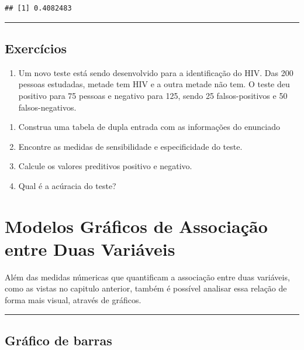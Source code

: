 \documentclass[
]{book}
\providecommand{\tightlist}{%
  \setlength{\itemsep}{0pt}\setlength{\parskip}{0pt}}
\begin{document}
\begin{verbatim}
## [1] 0.4082483
\end{verbatim}

\begin{center}\rule{0.5\linewidth}{0.5pt}\end{center}

\section{Exercícios}\label{exercuxedcios-4}

\begin{enumerate}
\def\labelenumi{\arabic{enumi}.}
\tightlist
\item
  Um novo teste está sendo desenvolvido para a identificação do HIV. Das 200 pessoas estudadas, metade tem HIV e a outra metade não tem. O teste deu positivo para 75 pessoas e negativo para 125, sendo 25 falsos-positivos e 50 falsos-negativos.
\end{enumerate}

\begin{enumerate}
\def\labelenumi{(\alph{enumi})}
\tightlist
\item
  Construa uma tabela de dupla entrada com as informações do enunciado
\item
  Encontre as medidas de sensibilidade e especificidade do teste.
\item
  Calcule os valores preditivos positivo e negativo.
\item
  Qual é a acúracia do teste?
\end{enumerate}

\chapter{Modelos Gráficos de Associação entre Duas Variáveis}\label{modelos_graficos8}

Além das medidas númericas que quantificam a associação entre duas variáveis, como as vistas no capitulo anterior, também é possível analisar essa relação de forma mais visual, através de gráficos.

\begin{center}\rule{0.5\linewidth}{0.5pt}\end{center}

\section{Gráfico de barras}\label{gruxe1fico-de-barras-1}
\end{document}
